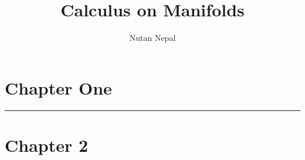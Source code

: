 
\title{Calculus on Manifolds}
\author{Nutan Nepal}



\maketitle
    \section*{Chapter One}
        
        
        
        \begin{questions}
            
            
            
            
            
        \end{questions}
        \hrule
    \section*{Chapter 2}
        \begin{questions}
            
            
            
            
        
            
            
            
            
            
            
            
            
            
            
            
            
            
        \end{questions}
